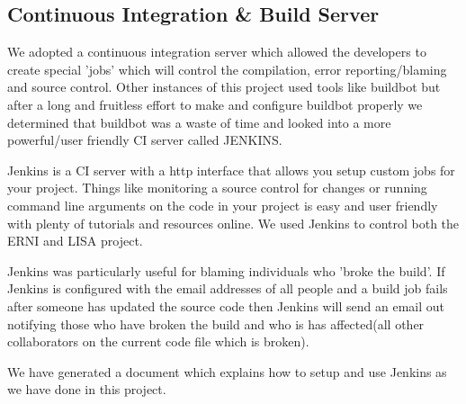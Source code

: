 \subsection{Continuous Integration \& Build Server}

We adopted a continuous integration server which allowed the developers to create special 'jobs' which will control the compilation, error reporting/blaming and source control. Other instances of this project used tools like buildbot but after a long and fruitless effort to make and configure buildbot properly we determined that buildbot was a waste of time and looked into a more powerful/user friendly CI server called JENKINS. 

Jenkins is a CI server with a http interface that allows you setup custom jobs for your project. Things like monitoring a source control for changes or running command line arguments on the code in your project is easy and user friendly with plenty of tutorials and resources online. We used Jenkins to control both the ERNI and LISA project. 

Jenkins was particularly useful for blaming individuals who 'broke the build'. If Jenkins is configured with the email addresses of all people and a build job fails after someone has updated the source code then Jenkins will send an email out notifying those who have broken the build and who is has affected(all other collaborators on the current code file which is broken).

We have generated a document which explains how to setup and use Jenkins as we have done in this project. 
